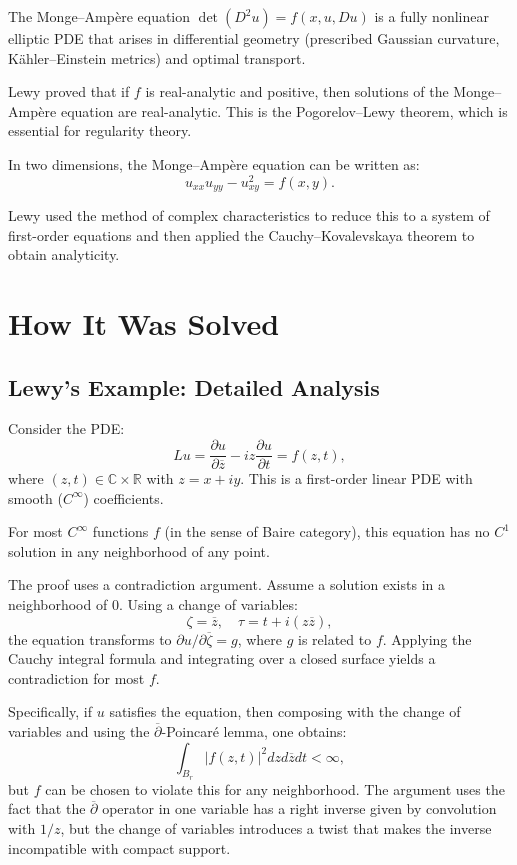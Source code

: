 The Monge--Amp\`{e}re equation $\det(D^2 u) = f(x, u, Du)$ is a fully nonlinear elliptic PDE that arises in differential geometry (prescribed Gaussian curvature, K\"{a}hler--Einstein metrics) and optimal transport.

Lewy proved that if $f$ is real-analytic and positive, then solutions of the Monge--Amp\`{e}re equation are real-analytic. This is the Pogorelov--Lewy theorem, which is essential for regularity theory.

In two dimensions, the Monge--Amp\`{e}re equation can be written as:
\[
u_{xx} u_{yy} - u_{xy}^2 = f(x, y).
\]

Lewy used the method of complex characteristics to reduce this to a system of first-order equations and then applied the Cauchy--Kovalevskaya theorem to obtain analyticity.

\section{How It Was Solved}

\subsection{Lewy's Example: Detailed Analysis}

Consider the PDE:
\[
L u = \frac{\partial u}{\partial \overline{z}} - i z \frac{\partial u}{\partial t} = f(z, t),
\]
where $(z, t) \in \mathbb{C} \times \mathbb{R}$ with $z = x + iy$. This is a first-order linear PDE with smooth ($C^\infty$) coefficients.

\begin{theorem}[Lewy, 1957]
For most $C^\infty$ functions $f$ (in the sense of Baire category), this equation has no $C^1$ solution in any neighborhood of any point.
\end{theorem}

The proof uses a contradiction argument. Assume a solution exists in a neighborhood of $0$. Using a change of variables:
\[
\zeta = \overline{z}, \quad \tau = t + i(z \overline{z}),
\]
the equation transforms to $\partial u/\partial \overline{\zeta} = g$, where $g$ is related to $f$. Applying the Cauchy integral formula and integrating over a closed surface yields a contradiction for most $f$.

Specifically, if $u$ satisfies the equation, then composing with the change of variables and using the $\overline{\partial}$-Poincar\'{e} lemma, one obtains:
\[
\int_{B_r} |f(z, t)|^2 dz d\overline{z} dt < \infty,
\]
but $f$ can be chosen to violate this for any neighborhood. The argument uses the fact that the $\overline{\partial}$ operator in one variable has a right inverse given by convolution with $1/z$, but the change of variables introduces a twist that makes the inverse incompatible with compact support.

